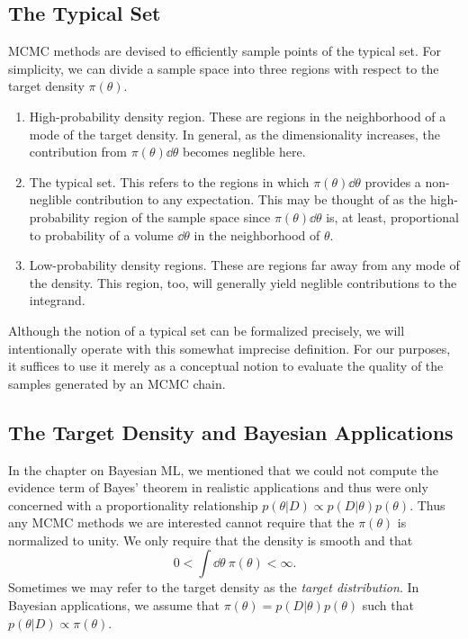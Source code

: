 \subsection{The Typical Set}
MCMC methods are devised to efficiently sample points of the typical set. For simplicity, we can divide a
sample space into three regions with respect to the target density $\pi(\theta)$.
\begin{enumerate}
    \item High-probability density region. These are regions in the neighborhood of a mode of the target density.
    In general, as the dimensionality increases, the contribution from $\pi(\theta) \dd \theta$ becomes neglible here.
    \item The typical set. This refers to the regions in which $\pi(\theta) \dd \theta$ provides a non-neglible contribution
    to any expectation. This may be thought of as the high-probability region of the sample space
    since $\pi(\theta) \dd \theta$ is, at least, proportional to probability of a volume $\dd\theta$ in the neighborhood of $\theta$. 
    \item Low-probability density regions. These are regions far away from any mode of the density. This region, too, will generally
    yield neglible contributions to the integrand.
\end{enumerate}
Although the notion of a typical set can be formalized precisely, we will intentionally 
operate with this somewhat imprecise definition. For our purposes, it suffices to use it merely as
a conceptual notion to evaluate the quality of the samples generated by an MCMC chain. 
\subsection{The Target Density and Bayesian Applications}
In the chapter on Bayesian ML, we mentioned that we could not compute the evidence term of Bayes' theorem in 
realistic applications and thus were only concerned with a proportionality relationship $p(\theta|D)\propto p(D|\theta)p(\theta)$. Thus any MCMC methods we are interested cannot require that the $\pi(\theta)$ is normalized to unity. We only require that the density is smooth and that 
\begin{equation}
  0 < \int \dd\theta \ \pi(\theta) < \infty.
\end{equation} 
Sometimes we may refer to the target density as the \textit{target distribution}.
In Bayesian applications, we assume that $\pi(\theta) = p(D|\theta)p(\theta)$ such that $p(\theta|D) \propto \pi(\theta)$.


